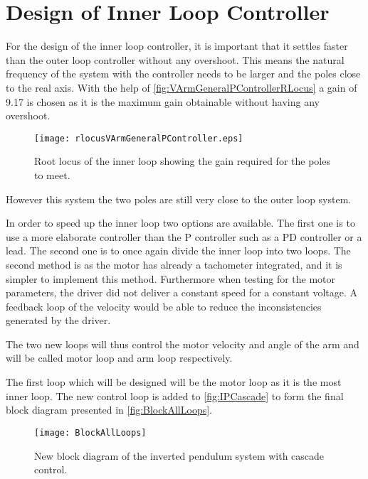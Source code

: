 \section{Design of Inner Loop Controller}
For the design of the inner loop controller, it is important that it settles faster than the outer loop controller without any overshoot. This means the natural frequency of the system with the controller needs to be larger and the poles close to the real axis. With the help of \autoref{fig:VArmGeneralPControllerRLocus} a gain of 9.17 is chosen as it is the maximum gain obtainable without having any overshoot.
\begin{figure} [htbp] 
	\centering
	\texttt{[image: rlocusVArmGeneralPController.eps]}
	\caption{Root locus of the inner loop showing the gain required for the poles to meet.}
	\label{fig:VArmGeneralPControllerRLocus}
\end{figure}

However this system the two poles are still very close to the outer loop system. 

In order to speed up the inner loop two options are available. The first one is to use a more elaborate controller than the P controller such as a PD controller or a lead. The second one is to once again divide the inner loop into two loops. The second method is as the motor has already a tachometer integrated, and it is simpler to implement this method. Furthermore when testing for the motor parameters, the driver did not deliver a constant speed for a constant voltage. A feedback loop of the velocity would be able to reduce the inconsistencies generated by the driver. 

The two new loops will thus control the motor velocity and angle of the arm and will be called motor loop and arm loop respectively.

The first loop which will be designed will be the motor loop as it is the most inner loop. The new control loop is added to \autoref{fig:IPCascade} to form the final block diagram presented in \autoref{fig:BlockAllLoops}.
\begin{figure}[htbp]
	\centering
	\texttt{[image: BlockAllLoops]}
	\caption{New block diagram of the inverted pendulum system with cascade control.}
	\label{fig:BlockAllLoops}
\end{figure}

